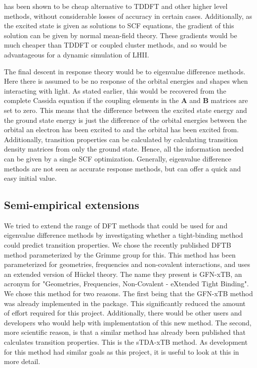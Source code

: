\dscf has been shown to be cheap alternative to TDDFT and other higher level
methods, without considerable losses of accuracy in certain cases\cite{Worster2021}.
Additionally, as the excited state is given as solutions to SCF equations,
the gradient of this solution can be given by normal mean-field theory.
These gradients would be much cheaper than TDDFT or coupled cluster methods, and
so would be advantageous for a dynamic simulation of LHII.

The final descent in response theory would be to eigenvalue difference methods. 
Here there is assumed to be no response of the orbital energies and shapes when 
interacting with light. As stated earlier, this would be recovered from the
complete Cassida equation if the coupling elements in the $\mathbf{A}$ and 
$\mathbf{B}$ matrices are set to zero. This means that the difference between 
the excited state energy and the ground state energy is just the difference of
the orbital energies between the orbital an electron has been excited to and the
orbital has been excited from. Additionally, transition properties can be 
calculated by calculating transition density matrices from only the ground state.
Hence, all the information needed can be given by a single SCF optimization. 
Generally, eigenvalue difference methods are not seen as accurate response methods,
but can offer a quick and easy initial value\cite{Gimon2009}.

\subsection{Semi-empirical extensions}
\label{subsec:dscf_xtb}
We tried to extend the range of DFT methods that could be used for \dscf and 
eigenvalue difference methods by investigating whether a tight-binding method
could predict transition properties.
We chose the recently published DFTB method parameterized by the Grimme group for
this. This method has been parameterized for geometries, frequencies and non-covalent
interactions, and uses an extended version of H{\"u}ckel theory. The name they
present is GFN-xTB, an acronym for "Geometries, Frequencies, Non-Covalent - eXtended 
Tight Binding".
We chose this method for two reasons. The first being that the GFN-xTB method was
already implemented in the  package. This significantly reduced the
amount of effort required for this project. Additionally, there would be other
users and developers who would help with implementation of this new method.
The second, more scientific reason, is that a similar method has already been
published that calculates transition properties. This is the sTDA-xTB method. 
As development for this method had similar goals as this project, it is useful
to look at this in more detail.

